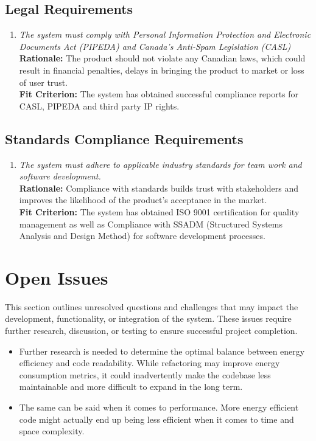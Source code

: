 \documentclass[12pt]{article}
\begin{document}
\subsection{Legal Requirements}
\begin{enumerate}[label=CR-LR \arabic*., wide=0pt, leftmargin=*]
	\item \emph{The system must comply with Personal Information Protection and Electronic Documents Act (PIPEDA) and Canada’s Anti-Spam Legislation (CASL)}\\
    {\bf Rationale:} The product should not violate any Canadian laws, which could result in  financial penalties, delays in bringing the product to market or loss of user trust.\\
    {\bf Fit Criterion:} The system has obtained successful compliance reports for CASL, PIPEDA and third party IP rights.
\end{enumerate}
\subsection{Standards Compliance Requirements}
\begin{enumerate}[label=CR-SCR \arabic*., wide=0pt, leftmargin=*]
	\item \emph{The system must adhere to applicable industry standards for team work and software development.}\\
    {\bf Rationale:} Compliance with standards builds trust with stakeholders and improves the likelihood of the product’s acceptance in the market.\\
    {\bf Fit Criterion:} The system has obtained ISO 9001 certification for quality management as well as Compliance with SSADM (Structured Systems Analysis and Design Method) for software development processes.
\end{enumerate}

\section{Open Issues}

This section outlines unresolved questions and challenges that may impact the development, functionality, or integration of the system. These issues require further research, discussion, or testing to ensure successful project completion.\\

\begin{itemize}
  \item Further research is needed to determine the optimal balance between energy efficiency and code readability. While refactoring may improve energy consumption metrics, it could inadvertently make the codebase less maintainable and more difficult to expand in the long term.
  \item The same can be said when it comes to performance. More energy efficient code might actually end up being less efficient when it comes to time and space complexity.
\end{itemize}
\end{document}
